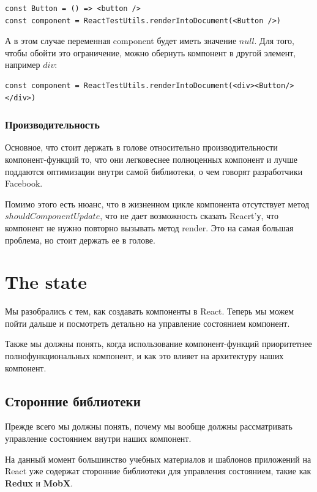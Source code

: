 \begin{lstlisting}
const Button = () => <button />
const component = ReactTestUtils.renderIntoDocument(<Button />)
\end{lstlisting}

А в этом случае переменная component будет иметь значение $null$. Для того, чтобы обойти это ограничение, можно обернуть компонент в другой элемент, например $div$:

\begin{lstlisting}
const component = ReactTestUtils.renderIntoDocument(<div><Button/></div>)
\end{lstlisting}

\subsubsection*{Производительность}

Основное, что стоит держать в голове относительно производительности компонент-функций то, что они легковеснее полноценных компонент и лучше поддаются оптимизации внутри самой библиотеки, о чем говорят разработчики Facebook. 

Помимо этого есть нюанс, что в жизненном цикле компонента отсутствует метод $shouldComponentUpdate$, что не дает возможность сказать Reacrt'у, что компонент не нужно повторно вызывать метод render. Это на самая большая проблема, но стоит держать ее в голове.


\section{The state}

Мы разобрались с тем, как создавать компоненты в React.
Теперь мы можем пойти дальше и посмотреть детально на управление состоянием компонент.

Также мы должны понять, когда использование компонент-функций приоритетнее полнофункциональных компонент, и как это влияет на архитектуру наших компонент. 

\subsection*{Сторонние библиотеки}

Прежде всего мы должны понять, почему мы вообще должны рассматривать управление состоянием внутри наших компонент. 

На данный момент большинство учебных материалов и шаблонов приложений на React уже содержат сторонние библиотеки для управления состоянием, такие как \textbf{Redux} и \textbf{MobX}.

